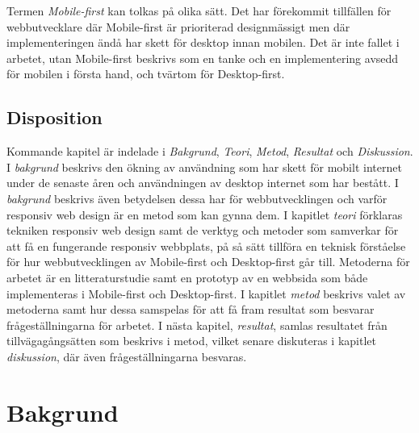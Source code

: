 \documentclass[11pt]{article}
\begin{document}
Termen \textit{Mobile-first} kan tolkas på olika sätt. Det har förekommit tillfällen för webbutvecklare där Mobile-first är prioriterad designmässigt men där implementeringen ändå har skett för desktop innan mobilen. Det är inte fallet i arbetet, utan Mobile-first beskrivs som en tanke och en implementering avsedd för mobilen i första hand, och tvärtom för Desktop-first. 

\subsection{Disposition}

Kommande kapitel är indelade i \textit{Bakgrund}, \textit{Teori}, \textit{Metod}, \textit{Resultat} och \textit{Diskussion}. I \textit{bakgrund} beskrivs den ökning av användning som har skett för mobilt internet under de senaste åren och användningen av desktop internet som har bestått. I \textit{bakgrund} beskrivs även betydelsen dessa har för webbutvecklingen och varför responsiv web design är en metod som kan gynna dem. I kapitlet \textit{teori} förklaras tekniken responsiv web design samt de verktyg och metoder som samverkar för att få en fungerande responsiv webbplats, på så sätt tillföra en teknisk förståelse för hur webbutvecklingen av Mobile-first och Desktop-first går till. Metoderna för arbetet är en litteraturstudie samt en prototyp av en webbsida som både implementeras i Mobile-first och Desktop-first. I kapitlet \textit{metod} beskrivs valet av metoderna samt hur dessa samspelas för att få fram resultat som besvarar frågeställningarna för arbetet. I nästa kapitel, \textit{resultat}, samlas resultatet från tillvägagångsätten som beskrivs i metod, vilket senare diskuteras i kapitlet \textit{diskussion}, där även frågeställningarna besvaras.



\newpage


\section{Bakgrund}
\end{document}
